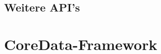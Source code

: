 
\subsection{Weitere API's}
\label{sec:technologies:iosandxcode:otherapis}


\section{CoreData-Framework}
\label{sec:technologies:coredata}
